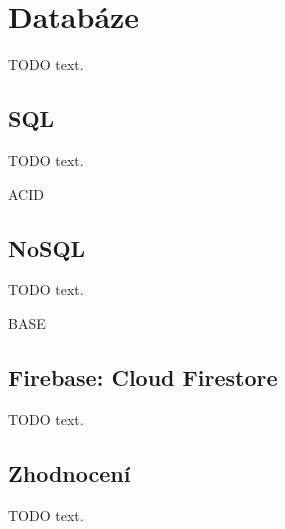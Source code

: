 \section{Databáze}

TODO text.








\subsection{SQL}

TODO text.

ACID

\subsection{NoSQL}

TODO text.

BASE

\subsection{Firebase: Cloud Firestore}

TODO text.






\subsection{Zhodnocení}

TODO text.
